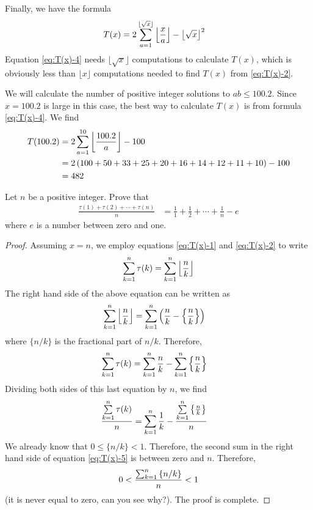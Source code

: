Finally, we have the formula
\begin{align}
	T(x) &= 2\sum_{a=1}^{\lfloor\sqrt x\rfloor}\left\lfloor{\frac{x}{a}}\right\rfloor-\left\lfloor{\sqrt{x}}\right\rfloor^2\label{eq:T(x)-4}
\end{align}
Equation \ref{eq:T(x)-4} needs $\lfloor \sqrt x \rfloor$ computations to calculate $T(x)$, which is obviously less than $\lfloor x \rfloor$ computations needed to find $T(x)$ from \ref{eq:T(x)-2}.

\begin{example}
	We will calculate the number of positive integer solutions to $ab \leq 100.2$. Since $x=100.2$ is large in this case, the best way to calculate $T(x)$ is from formula \ref{eq:T(x)-4}. We find
		\begin{align*}
			T(100.2) &= 2\sum_{a=1}^{10}\left\lfloor{\frac{100.2}{a}}\right\rfloor- 100\\
				 &= 2\left(100 + 50 + 33 + 25 + 20 + 16 + 14 + 12 + 11 + 10\right) - 100\\
				 &= 482
		\end{align*}
\end{example}

\begin{theorem}
	Let $n$ be a positive integer. Prove that
		\begin{align*}
			\frac{\tau(1) + \tau(2) + \cdots + \tau(n)}{n}
				& = \frac{1}{1} + \frac{1}{2} + \cdots + \frac{1}{n} - e
		\end{align*}
	where $e$ is a number between zero and one.
\end{theorem}

\begin{proof}
	Assuming $x=n$, we employ equations \ref{eq:T(x)-1} and \ref{eq:T(x)-2} to write
		\begin{align*}
			\sum_{k=1}^{n} \tau(k) = \sum_{k=1}^{n}\left\lfloor{\frac{n}{k}}\right\rfloor
		\end{align*}
	The right hand side of the above equation can be written as
		\begin{align*}
			\sum_{k=1}^{n}\left\lfloor{\frac{n}{k}}\right\rfloor
				&= \sum_{k=1}^{n}\left(\frac{n}{k} - \left\{\frac{n}{k}\right\}\right)
		\end{align*}
	where $\{n/k\}$ is the fractional part of $n/k$. Therefore,
		\begin{align}
			\sum_{k=1}^{n} \tau(k)
				& = \sum_{k=1}^{n} \frac{n}{k}  - \sum_{k=1}^{n}\left\{\frac{n}{k}\right\}\label{eq:T(x)-5}
		\end{align}
	Dividing both sides of this last equation by $n$, we find
		\begin{align}
		\frac{\sum\limits_{k=1}^{n} \tau(k)}{n}
			& = \sum_{k=1}^{n} \frac{1}{k}  - \frac{\sum\limits_{k=1}^{n}\left\{\frac{n}{k}\right\}}{n}
		\end{align}
	We already know that $0 \leq \{n/k\}<1$. Therefore, the second sum in the right hand side of equation \ref{eq:T(x)-5} is between zero and $n$. Therefore,
		\begin{align*}
			0 < \frac{\sum_{k=1}^{n}\left\{n/k\right\}}{n} < 1
		\end{align*}
	(it is never equal to zero, can you see why?). The proof is complete.
\end{proof}

